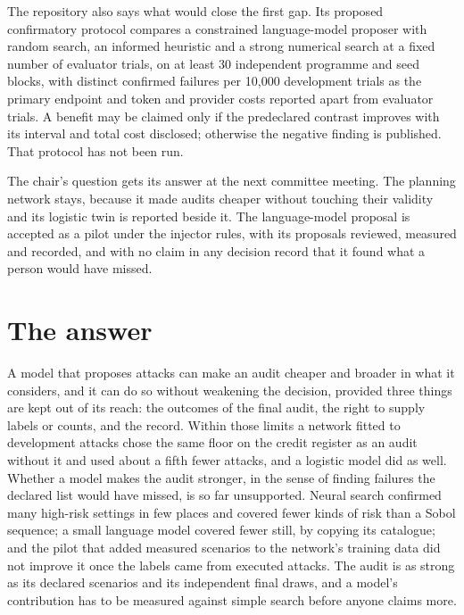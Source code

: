 The repository also says what would close the first gap. Its proposed confirmatory
protocol compares a constrained language-model proposer with random search, an informed
heuristic and a strong numerical search at a fixed number of evaluator trials, on at
least 30 independent programme and seed blocks, with distinct confirmed failures per
10{,}000 development trials as the primary endpoint and token and provider costs
reported apart from evaluator trials. A benefit may be claimed only if the predeclared
contrast improves with its interval and total cost disclosed; otherwise the negative
finding is published. That protocol has not been run.

The chair's question gets its answer at the next committee meeting. The planning network
stays, because it made audits cheaper without touching their validity and its logistic
twin is reported beside it. The language-model proposal is accepted as a pilot under
the injector rules, with its proposals reviewed, measured and recorded, and with no
claim in any decision record that it found what a person would have missed.

\section{The answer}

A model that proposes attacks can make an audit cheaper and broader in what it
considers, and it can do so without weakening the decision, provided three things are
kept out of its reach: the outcomes of the final audit, the right to supply labels or
counts, and the record. Within those limits a network fitted to development attacks
chose the same floor on the credit register as an audit without it and used about a
fifth fewer attacks, and a logistic model did as well. Whether a model makes the audit
stronger, in the sense of finding failures the declared list would have missed, is so
far unsupported. Neural search confirmed many high-risk settings in few places and
covered fewer kinds of risk than a Sobol sequence; a small language model covered fewer
still, by copying its catalogue; and the pilot that added measured scenarios to the
network's training data did not improve it once the labels came from executed attacks.
The audit is as strong as its declared scenarios and its independent final draws, and a
model's contribution has to be measured against simple search before anyone claims
more.

